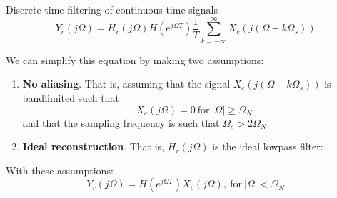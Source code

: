 \documentclass[10pt]{beamer}
\begin{document}
\begin{frame}{Discrete-time filtering of continuous-time signals}	
	\begin{equation*}
		Y_r(j\Omega) = H_r(j\Omega)H(e^{j\Omega T})\frac{1}{T}\sum_{k=-\infty}^{\infty}X_c(j(\Omega - k\Omega_s)) \label{eq:ct-dt-dsp}
	\end{equation*}
	
	We can simplify this equation by making two assumptions:
	\begin{enumerate}
		\item \textbf{No aliasing}. That is, assuming that the signal $X_c(j(\Omega - k\Omega_s))$ is bandlimited such that
		\begin{equation*}
			X_c(j\Omega) = 0~\text{for}~|\Omega| \geq \Omega_N
		\end{equation*}
		and that the sampling frequency is such that $\Omega_s > 2\Omega_N$.
		\item \textbf{Ideal reconstruction}. That is, $H_r(j\Omega)$ is the ideal lowpass filter:
	\end{enumerate}
	
	With these assumptions:
	\begin{equation*}
	Y_r(j\Omega) = H(e^{j\Omega T})X_c(j\Omega),~\text{for}~|\Omega| < \Omega_N
	\end{equation*}

\end{frame}
\end{document}
